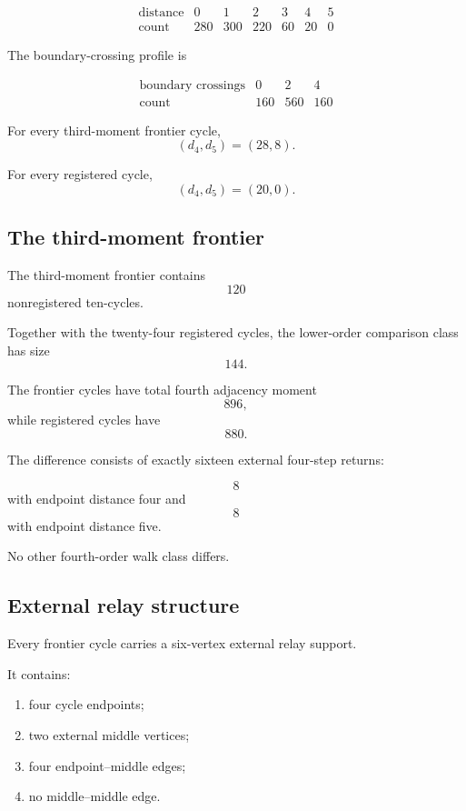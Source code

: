 \[
\begin{array}{c|rrrrrr}
\text{distance} & 0 & 1 & 2 & 3 & 4 & 5\\
\hline
\text{count} & 280 & 300 & 220 & 60 & 20 & 0
\end{array}
\]

The boundary-crossing profile is

\[
\begin{array}{c|rrr}
\text{boundary crossings} & 0 & 2 & 4\\
\hline
\text{count} & 160 & 560 & 160
\end{array}
\]

For every third-moment frontier cycle,
\[
(d_4,d_5)=(28,8).
\]

For every registered cycle,
\[
(d_4,d_5)=(20,0).
\]

\subsection{The third-moment frontier}

The third-moment frontier contains
\[
120
\]
nonregistered ten-cycles.

Together with the twenty-four registered cycles, the lower-order
comparison class has size
\[
144.
\]

The frontier cycles have total fourth adjacency moment
\[
896,
\]
while registered cycles have
\[
880.
\]

The difference consists of exactly sixteen external four-step returns:

\[
8
\]
with endpoint distance four and
\[
8
\]
with endpoint distance five.

No other fourth-order walk class differs.

\subsection{External relay structure}

Every frontier cycle carries a six-vertex external relay support.

It contains:

\begin{enumerate}
    \item four cycle endpoints;
    \item two external middle vertices;
    \item four endpoint--middle edges;
    \item no middle--middle edge.
\end{enumerate}

